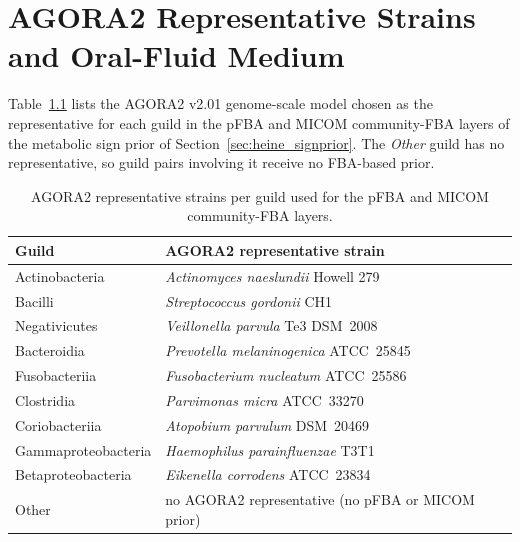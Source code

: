 \chapter{AGORA2 Representative Strains and Oral-Fluid Medium}
\label{app:agora}

Table~\ref{tab:agora_strains} lists the AGORA2 v2.01 genome-scale model chosen as
the representative for each guild in the pFBA and MICOM community-FBA layers of the metabolic sign prior of
Section~\ref{sec:heine_signprior}. The \emph{Other} guild has no representative, so guild
pairs involving it receive no FBA-based prior.

\begin{table}[htbp]
  \centering\small
  \begin{tabular}{@{}ll@{}}
    \toprule
    Guild & AGORA2 representative strain\\
    \midrule
    Actinobacteria      & \textit{Actinomyces naeslundii} Howell 279\\
    Bacilli             & \textit{Streptococcus gordonii} CH1\\
    Negativicutes       & \textit{Veillonella parvula} Te3 DSM~2008\\
    Bacteroidia         & \textit{Prevotella melaninogenica} ATCC~25845\\
    Fusobacteriia       & \textit{Fusobacterium nucleatum} ATCC~25586\\
    Clostridia          & \textit{Parvimonas micra} ATCC~33270\\
    Coriobacteriia      & \textit{Atopobium parvulum} DSM~20469\\
    Gammaproteobacteria & \textit{Haemophilus parainfluenzae} T3T1\\
    Betaproteobacteria  & \textit{Eikenella corrodens} ATCC~23834\\
    Other               & no AGORA2 representative (no pFBA or MICOM prior)\\
    \bottomrule
  \end{tabular}
  \caption[AGORA2 representative strains]{AGORA2 representative strains per guild
  used for the pFBA and MICOM community-FBA layers.}
  \label{tab:agora_strains}
\end{table}

